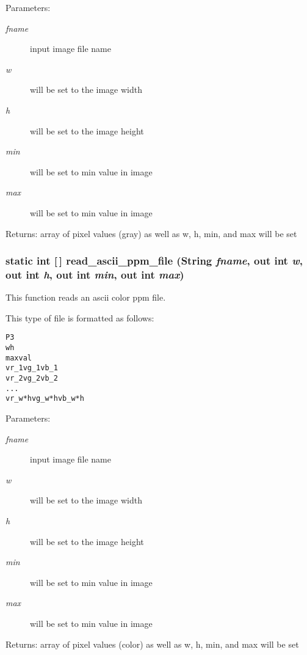 \begin{Desc}
\item[Parameters:]
\begin{description}
\item[{\em fname}]input image file name \item[{\em w}]will be set to the image width \item[{\em h}]will be set to the image height \item[{\em min}]will be set to min value in image \item[{\em max}]will be set to min value in image\end{description}
\end{Desc}
\begin{Desc}
\item[Returns:]array of pixel values (gray) as well as w, h, min, and max will be set \end{Desc}
\subsubsection{\setlength{\rightskip}{0pt plus 5cm}static int [$\,$] read\_\-ascii\_\-ppm\_\-file (String {\em fname}, out int {\em w}, out int {\em h}, out int {\em min}, out int {\em max})\hspace{0.3cm}{\tt  [static, protected]}}\label{class_c_s_image_viewer_1_1pnm_helper_a184666e0242cb45d7604f8a9828db5f}


This function reads an ascii color ppm file. 

This type of file is formatted as follows: \small\begin{alltt}
    P3
    w h
    maxval
    vr\_1 vg\_1 vb\_1
    vr\_2 vg\_2 vb\_2
    . . .
    vr\_w*h vg\_w*h vb\_w*h
  \end{alltt}\normalsize 


\begin{Desc}
\item[Parameters:]
\begin{description}
\item[{\em fname}]input image file name \item[{\em w}]will be set to the image width \item[{\em h}]will be set to the image height \item[{\em min}]will be set to min value in image \item[{\em max}]will be set to min value in image\end{description}
\end{Desc}
\begin{Desc}
\item[Returns:]array of pixel values (color) as well as w, h, min, and max will be set \end{Desc}
